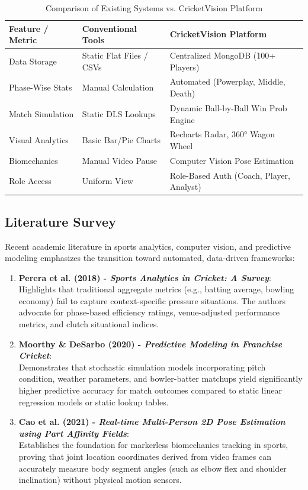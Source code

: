 \documentclass[12pt,a4paper]{report}
\begin{document}
\begin{table}[H]
\centering
\caption{Comparison of Existing Systems vs. CricketVision Platform}
\label{tab:system_comparison}
\begin{tabular}{lll}
\toprule
\textbf{Feature / Metric} & \textbf{Conventional Tools} & \textbf{CricketVision Platform} \\
\midrule
Data Storage & Static Flat Files / CSVs & Centralized MongoDB (100+ Players) \\
Phase-Wise Stats & Manual Calculation & Automated (Powerplay, Middle, Death) \\
Match Simulation & Static DLS Lookups & Dynamic Ball-by-Ball Win Prob Engine \\
Visual Analytics & Basic Bar/Pie Charts & Recharts Radar, 360° Wagon Wheel \\
Biomechanics & Manual Video Pause & Computer Vision Pose Estimation \\
Role Access & Uniform View & Role-Based Auth (Coach, Player, Analyst) \\
\bottomrule
\end{tabular}
\end{table}

\subsection{Literature Survey}
Recent academic literature in sports analytics, computer vision, and predictive modeling emphasizes the transition toward automated, data-driven frameworks:

\begin{enumerate}
    \item \textbf{Perera et al. (2018) - \textit{Sports Analytics in Cricket: A Survey}}:\\
    Highlights that traditional aggregate metrics (e.g., batting average, bowling economy) fail to capture context-specific pressure situations. The authors advocate for phase-based efficiency ratings, venue-adjusted performance metrics, and clutch situational indices.
    
    \item \textbf{Moorthy \& DeSarbo (2020) - \textit{Predictive Modeling in Franchise Cricket}}:\\
    Demonstrates that stochastic simulation models incorporating pitch condition, weather parameters, and bowler-batter matchups yield significantly higher predictive accuracy for match outcomes compared to static linear regression models or static lookup tables.
    
    \item \textbf{Cao et al. (2021) - \textit{Real-time Multi-Person 2D Pose Estimation using Part Affinity Fields}}:\\
    Establishes the foundation for markerless biomechanics tracking in sports, proving that joint location coordinates derived from video frames can accurately measure body segment angles (such as elbow flex and shoulder inclination) without physical motion sensors.
\end{enumerate}
\end{document}
